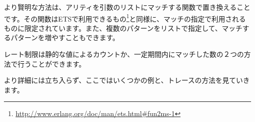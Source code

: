 より賢明な方法は、アリティを引数のリストにマッチする関数で置き換えることです。その関数はETSで利用できるもの\footnote{\href{http://www.erlang.org/doc/man/ets.html\#fun2ms-1}{http://www.erlang.org/doc/man/ets.html\#fun2ms-1}}と同様に、マッチの指定で利用されるものに限定されています。また、複数のパターンをリストで指定して、マッチするパターンを増やすこともできます。

レート制限は静的な値によるカウントか、一定期間内にマッチした数の２つの方法で行うことができます。

より詳細には立ち入らず、ここではいくつかの例と、トレースの方法を見ていきます。

% 
% 
% 
% 
% 
% 
% 
% 
% 
% 

